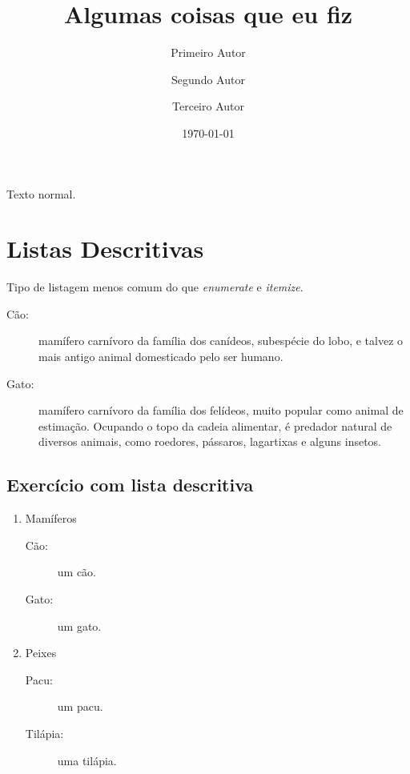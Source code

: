 \documentclass[a4paper,12pt]{article}
\begin{document}
\author{Primeiro Autor \and Segundo Autor \and Terceiro Autor}
\title{Algumas coisas que eu fiz}
\date{\today}
\maketitle

Texto normal.

\section{Listas Descritivas}

Tipo de listagem menos comum do que \emph{enumerate} e \emph{itemize}.

\begin{description}
	\item[Cão:] mamífero carnívoro da família dos canídeos, subespécie do lobo, e
	talvez o mais antigo animal domesticado pelo ser humano.
	\item[Gato:] mamífero carnívoro da família dos felídeos, muito popular como
	animal de estimação. Ocupando o topo da cadeia alimentar, é predador natural
	de diversos animais, como roedores, pássaros, lagartixas e alguns insetos.
\end{description}


\subsection{Exercício com lista descritiva}

\begin{enumerate}
	\item Mamíferos
	\begin{description}
		\item[Cão:] um cão.
		\item[Gato:] um gato.
	\end{description}
	\item Peixes
	\begin{description}
		\item[Pacu:] um pacu.
		\item[Tilápia:] uma tilápia.
	\end{description}
\end{enumerate}
\end{document}
